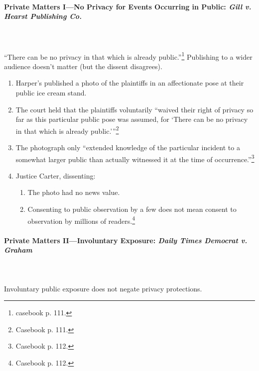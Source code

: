 \paragraph{Private Matters I---No Privacy for Events Occurring in Public: 
\emph{Gill v. Hearst Publishing Co.}}
~\\\\
``There can be no privacy in that which is already public.''\footnote{casebook 
p. 111.} Publishing to a wider audience doesn't matter (but the dissent 
disagrees).

\begin{enumerate}
    \item Harper's published a photo of the plaintiffs in an affectionate pose 
    at their public ice cream stand.
    \item The court held that the plaintiffs voluntarily \enquote{waived their 
    right of privacy so far as this particular public pose was assumed, for 
    \enquote{There can be no privacy in that which is already 
    public.}}\footnote{Casebook p. 111.}
    \item The photograph only ``extended knowledge of the particular incident to 
    a somewhat larger public than actually witnessed it at the time of 
    occurrence.''\footnote{Casebook p. 112.}
    \item Justice Carter, dissenting:
    \begin{enumerate}
        \item The photo had no news value.
        \item Consenting to public observation by a few does not mean consent to 
        observation by millions of readers.\footnote{Casebook p. 112.}
    \end{enumerate}
\end{enumerate}

\paragraph{Private Matters II---Involuntary Exposure: \emph{Daily Times Democrat 
v. Graham}}
~\\\\
Involuntary public exposure does not negate privacy protections. 

